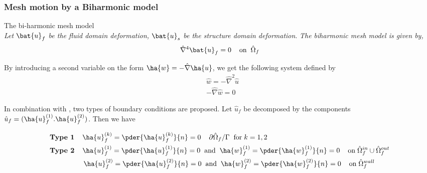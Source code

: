 \subsubsection*{Mesh motion by a Biharmonic model}
\begin{equat}
The bi-harmonic mesh model \\ \textit{Let} $\bat{u}_f$ \textit{be the fluid domain deformation,} $\bat{u}_s$ \textit{be the structure domain deformation}. \textit{The biharmonic mesh model is given by, }   
\begin{align*}
\hat{\nabla}^4 \bat{u}_f = 0 \hspace{4mm} \text{on} \hspace{2mm} \hat{\Omega}_f 
\end{align*}
\end{equat}

By introducing a second variable on the form $\ha{w} = - \hat{\nabla} \ha{u}$, we get the following system defined by 
\begin{align*}
&\hat{w} = -\hat{\nabla}^2\hat{u} \\
&- \hat{\nabla} \hat{w} = 0
\end{align*}

In combination with \cite{Wicka}, two types of boundary conditions are proposed. Let 
$\hat{u}_f$ be decomposed by the components $\hat{u}_f = (\ha{u}_f^{(1)}. \ha{u}_f^{(2)})$. Then we have

\begin{align*}
&\textbf{Type 1} \hspace{4mm} \ha{u}_f^{(k)} = \pder{\ha{u}_f^{(k)}}{n} = 0 \hspace{4mm} \partial \hat{\Omega}_f / \Gamma \hspace{2mm} \text{for} \hspace{1mm} k = 1, 2 \\
&\textbf{Type 2} \hspace{4mm} \ha{u}_f^{(1)} = \pder{\ha{u}_f^{(1)}}{n} = 0 
\hspace{2mm} \text{and} \hspace{2mm} \ha{w}_f^{(1)} = \pder{\ha{w}_f^{(1)}}{n} = 0 \hspace{4mm} \text{on} \hspace{1mm} \hat{\Omega}_f^{in} \cup \hat{\Omega}_f^{out} \\ 
&\hspace{17mm}  \ha{u}_f^{(2)} = \pder{\ha{u}_f^{(2)}}{n} = 0 
\hspace{2mm} \text{and} \hspace{2mm} \ha{w}_f^{(2)} = \pder{\ha{w}_f^{(2)}}{n} = 0 \hspace{4mm} \text{on} \hspace{1mm}  \hat{\Omega}_f^{wall}
\end{align*}

